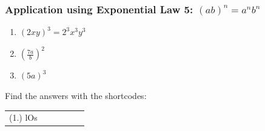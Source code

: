             \subsubsection{ Application using Exponential Law 5: ${\left(ab\right)}^{n}={a}^{n}{b}^{n}$ }
            \nopagebreak
        \label{m38359*id66288}\begin{enumerate}[noitemsep, label=\textbf{\arabic*}. ] 
            \label{m38359*uid31}\item 
            \begin{math}{\left(2xy\right)}^{3}={2}^{3}{x}^{3}{y}^{3}\end{math}
      \label{m38359*uid32}\item 
        \begin{math}{\left(\frac{7a}{b}\right)}^{2}\end{math}
      \label{m38359*uid33}\item 
        \begin{math}{\left(5a\right)}^{3}\end{math}
\newline
\newline
          \end{enumerate}
      \label{m38359*uid34}
\par {} Find the answers with the shortcodes:
 \par \begin{tabular}[h]{cccccc}
 (1.) lOs  & \end{tabular}
